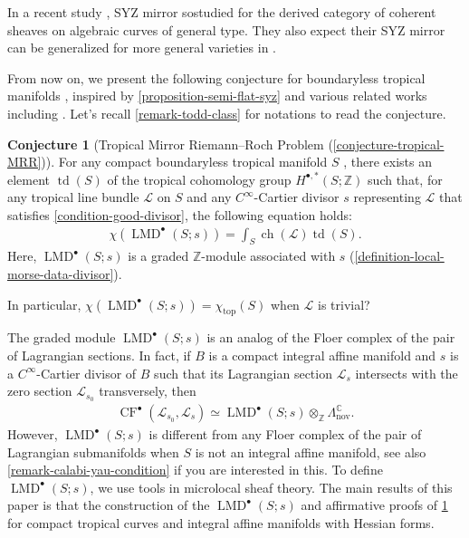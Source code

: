 \documentclass[a4paper,dvipdfmx,reqno,12pt]{amsart}
\theoremstyle{definition}
\newtheorem{conjecture}[theorem]{Conjecture}
\newcommand{\Z}{\mathbb{Z}}%
\newcommand{\mcal}[1]{\mathcal{#1}}%
\newcommand{\opn}[1]{\operatorname{#1}}
\numberwithin{equation}{section}
\begin{document}
In a recent study 
\cite{auroux2022lagrangian}, 
SYZ mirror sostudied for the derived category 
of coherent sheaves on algebraic curves 
of general type. 
They also expect their SYZ mirror can be 
generalized for more
general varieties in 
\cite[{}]{auroux2022lagrangian}.

From now on, we present the following conjecture
for boundaryless tropical manifolds 
\cite[]{MR4246795},
inspired by \cref{proposition-semi-flat-syz}
and various related works including 
\cite{auroux2022lagrangian}.
Let's recall \cref{remark-todd-class} for notations 
to read the conjecture.

\begin{conjecture}[{Tropical Mirror Riemann--Roch Problem
(\cref{conjecture-tropical-MRR})}]
\label{conjecture-tropical-MRR-preface}
For any compact boundaryless tropical manifold $S$
\cite[]{MR4246795}, 
there exists an element $\opn{td}(S)$ of the tropical 
cohomology group $H^{\bullet,*}(S;\mathbb{Z})$ such that, 
for any tropical line bundle $\mathcal{L}$ on $S$ and 
any $C^{\infty}$-Cartier divisor $s$ representing 
$\mathcal{L}$ that satisfies 
\cref{condition-good-divisor}, 
the following equation holds:
\begin{align}
\chi(\opn{LMD}^{\bullet}(S;s))=
\int_S \opn{ch}(\mcal{L})\opn{td}(S).
\end{align}
Here, $\opn{LMD}^{\bullet}(S;s)$ is a graded $\Z$-module 
associated with $s$ 
(\cref{definition-local-morse-data-divisor}). 

In particular, 
$\chi(\opn{LMD}^{\bullet}(S;s))=\chi_{\opn{top}}(S)$
when $\mcal{L}$ is trivial?
\end{conjecture}
The graded module $\opn{LMD}^{\bullet}(S;s)$ is 
an analog of the Floer complex of the pair of Lagrangian 
sections. In fact, if $B$ is a compact integral affine 
manifold and $s$ is a $C^{\infty}$-Cartier divisor of 
$B$ such that its Lagrangian section $\mathscr{L}_s$ intersects 
with the zero section $\mathscr{L}_{s_0}$ transversely,
then 
\begin{align}
\opn{CF}^{\bullet}(\mathscr{L}_{s_0},\mathscr{L}_{s})
\simeq \opn{LMD}^{\bullet}(S;s)\otimes_{\mathbb{Z}}
\Lambda_{\mathrm{nov}}^{\mathbb{C}}.
\end{align}
However, $\opn{LMD}^{\bullet}(S;s)$ is different 
from any Floer complex of the pair of Lagrangian 
submanifolds when $S$ is not an integral affine 
manifold, see also \cref{remark-calabi-yau-condition} 
if you are interested in this. 
To define $\opn{LMD}^{\bullet}(S;s)$, 
we use tools in microlocal sheaf theory.
The main results of this paper is that 
the construction of the 
$\opn{LMD}^{\bullet}(S;s)$ and affirmative 
proofs of \cref{conjecture-tropical-MRR-preface}
for compact tropical curves and integral affine 
manifolds with Hessian forms. 
\end{document}
